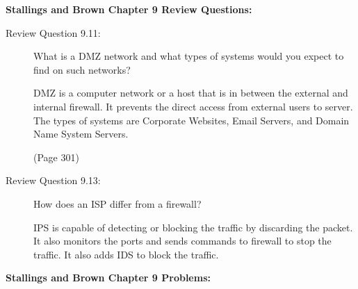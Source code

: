 \documentclass[12pt]{article}
\begin{document}
\renewcommand{\headrulewidth}{0.4pt}
\vspace{-3mm}
\hspace{-2em}
{\Large \textbf{Stallings and Brown Chapter 9 Review Questions:}} \par \vspace{-0.5em}
\begin{description}
    \item[Review Question 9.11:]{\color{grey}What is a DMZ network and what types of systems would you expect to find on such networks?}  
    
    DMZ is a computer network or a host that is in between the external and internal firewall. It prevents the direct access from external users to server. The types of systems are Corporate Websites, Email Servers, and Domain Name System Servers.
    
    (Page 301)
    
    \item[Review Question 9.13:]{\color{grey}How does an ISP differ from a firewall?}  
    
    IPS is capable of detecting or blocking the traffic by discarding the packet. It also monitors the ports and sends commands to firewall to stop the traffic. It also adds IDS to block the traffic. 
    
\end{description}
\hspace{-2em}
{\Large \textbf{Stallings and Brown Chapter 9 Problems:}} \par \vspace{-0.5em}
\end{document}
